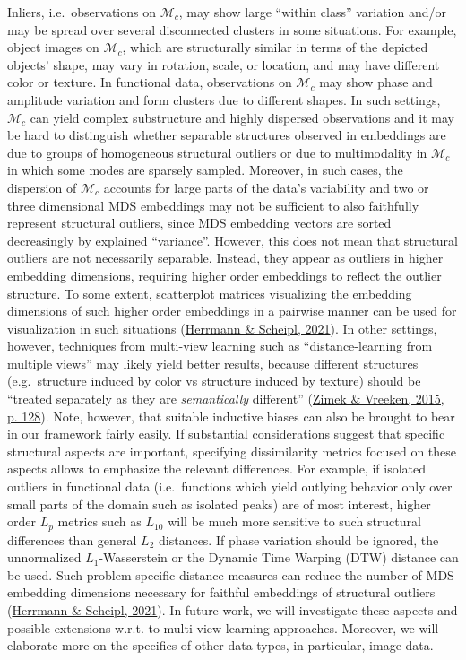 \documentclass[
  10pt]{article}
\newcommand{\co}{c}
\newcommand{\Min}{\mathcal{M}_{\co}}
\begin{document}
Inliers, i.e.~observations on \(\Min\), may show large ``within class'' variation and/or may be spread over several disconnected clusters in some situations. For example, object images on \(\Min\), which are structurally similar in terms of the depicted objects' shape, may vary in rotation, scale, or location, and may have different color or texture. In functional data, observations on \(\Min\) may show phase and amplitude variation and form clusters due to different shapes. In such settings, \(\Min\) can yield complex substructure and highly dispersed observations and it may be hard to distinguish whether separable structures observed in embeddings are due to groups of homogeneous structural outliers or due to multimodality in \(\Min\) in which some modes are sparsely sampled. Moreover, in such cases, the dispersion of \(\Min\) accounts for large parts of the data's variability and two or three dimensional MDS embeddings may not be sufficient to also faithfully represent structural outliers, since MDS embedding vectors are sorted decreasingly by explained ``variance''. However, this does not mean that structural outliers are not necessarily separable. Instead, they appear as outliers in higher embedding dimensions, requiring higher order embeddings to reflect the outlier structure. To some extent, scatterplot matrices visualizing the embedding dimensions of such higher order embeddings in a pairwise manner can be used for visualization in such situations (\protect\hyperlink{ref-herrmann2021geometric}{Herrmann \& Scheipl, 2021}). In other settings, however, techniques from multi-view learning such as ``distance-learning from multiple views'' may likely yield better results, because different structures (e.g.~structure induced by color vs structure induced by texture) should be ``treated separately as they are \emph{semantically} different'' (\protect\hyperlink{ref-zimek2015blind}{Zimek \& Vreeken, 2015, p. 128}). Note, however, that suitable inductive biases can also be brought to bear in our framework fairly easily. If substantial considerations suggest that specific structural aspects are important, specifying dissimilarity metrics focused on these aspects allows to emphasize the relevant differences. For example, if isolated outliers in functional data (i.e.~functions which yield outlying behavior only over small parts of the domain such as isolated peaks) are of most interest, higher order \(L_p\) metrics such as \(L_{10}\) will be much more sensitive to such structural differences than general \(L_2\) distances. If phase variation should be ignored, the unnormalized \(L_1\)-Wasserstein or the Dynamic Time Warping (DTW) distance can be used. Such problem-specific distance measures can reduce the number of MDS embedding dimensions necessary for faithful embeddings of structural outliers (\protect\hyperlink{ref-herrmann2021geometric}{Herrmann \& Scheipl, 2021}). In future work, we will investigate these aspects and possible extensions w.r.t. to multi-view learning approaches. Moreover, we will elaborate more on the specifics of other data types, in particular, image data.
\end{document}
